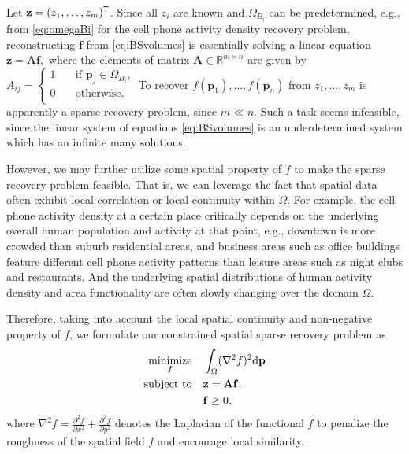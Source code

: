 Let $\mathbf z = (z_1,\ldots,z_m)^{\sf T}$.
Since all $z_i$ are known and $\Omega_{B_i}$ can be predetermined, e.g., from \eqref{eq:omegaBi} for the cell phone activity density recovery problem, reconstructing $\mathbf f$ from \eqref{eq:BSvolumes} is essentially solving a linear equation
$
	\mathbf z = \mathbf A \mathbf f,
$
where the elements of matrix $\mathbf A\in \mathbb R^{m\times n}$ are given by 
$
A_{ij} = \left\{
	\begin{array}{ll}
		1 & \quad\text{if $\mathbf p_j \in \Omega_{B_i}$,}\\
		0 & \quad\text{otherwise.}\\
	\end{array}
\right.
$
To recover $f(\mathbf p_1),\ldots, f(\mathbf p_n)$ from $z_1,\ldots, z_m$ is apparently a sparse recovery problem, since $m\ll n$. Such a task seems infeasible, since the linear system of equations \eqref{eq:BSvolumes} is an underdetermined system which has an infinite many solutions. 

However, we may further utilize some spatial property of $f$ to make the sparse recovery problem feasible. That is, we can leverage the fact that spatial data often exhibit local correlation or local continuity within $\Omega$. For example, the cell phone activity density at a certain place critically depends on the underlying overall human population and activity at that point, e.g., downtown is more crowded than suburb residential areas, and business areas such as office buildings feature different cell phone activity patterns than leisure areas such as night clubs and restaurants. And the underlying spatial distributions of human activity density and area functionality are often slowly changing over the domain $\Omega$. 

Therefore, taking into account the local spatial continuity and non-negative property of $f$, we formulate our constrained spatial sparse recovery problem as
\begin{equation}
\label{eq:prob0}
\begin{split}
	\underset{f}{\mbox{minimize}}\quad 		& \int_\Omega(\nabla^2 f)^2\mathrm{d}\mathbf p \\
	\mbox{subject to}\quad & \mathbf z = \mathbf A \mathbf f,\\
						&\mathbf f\ge 0,
\end{split}
\end{equation}
where $\nabla^2 f= \frac{\partial^2 f}{\partial x^2}+\frac{\partial^2 f}{\partial y^2}$ denotes the Laplacian of the functional $f$  to penalize the roughness of the spatial field $f$ and encourage local similarity.

